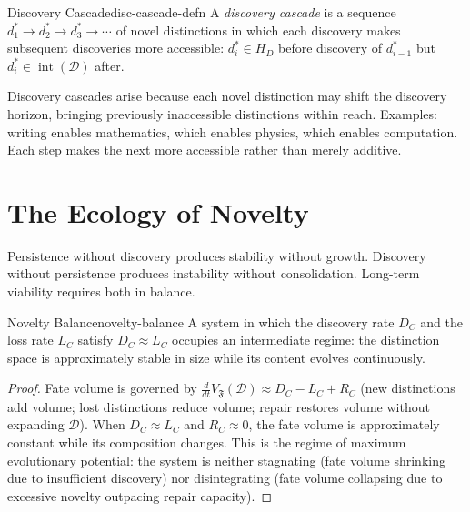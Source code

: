 \documentclass[12pt,twoside,openright]{book}
\newcommand{\distset}{\mathcal{D}}        %
\newcommand{\fateMap}{\mathfrak{F}}
\providecommand{\fateVol}[1]{V_{\fateMap}(#1)}
\providecommand{\discRate}{D_{C}}
\providecommand{\lossRate}{L_{C}}
\providecommand{\repairRate}{R_{C}}
\providecommand{\discHorizon}{H_{D}}
\begin{document}
\begin{definition}{Discovery Cascade}{disc-cascade-defn}
A \emph{discovery cascade} is a sequence
$d_1^*\to d_2^*\to d_3^*\to\cdots$ of novel distinctions in
which each discovery makes subsequent discoveries more
accessible: $d_i^*\in\discHorizon$ before discovery of
$d_{i-1}^*$ but $d_i^*\in\operatorname{int}(\distset)$ after.
\end{definition}

Discovery cascades arise because each novel distinction may
shift the discovery horizon, bringing previously inaccessible
distinctions within reach. Examples: writing enables
mathematics, which enables physics, which enables computation.
Each step makes the next more accessible rather than merely
additive.

\section{The Ecology of Novelty}

Persistence without discovery produces stability without growth.
Discovery without persistence produces instability without
consolidation. Long-term viability requires both in balance.

\begin{proposition}{Novelty Balance}{novelty-balance}
A system in which the discovery rate $\discRate$ and the loss
rate $\lossRate$ satisfy $\discRate\approx\lossRate$ occupies
an intermediate regime: the distinction space is approximately
stable in size while its content evolves continuously.
\begin{proof}
Fate volume is governed by
$\frac{d}{dt}\fateVol{\distset}
\approx\discRate-\lossRate+\repairRate$
(new distinctions add volume; lost distinctions reduce volume;
repair restores volume without expanding $\distset$). When
$\discRate\approx\lossRate$ and $\repairRate\approx 0$, the
fate volume is approximately constant while its composition
changes. This is the regime of maximum evolutionary potential:
the system is neither stagnating (fate volume shrinking due to
insufficient discovery) nor disintegrating (fate volume
collapsing due to excessive novelty outpacing repair capacity).
\end{proof}
\end{proposition}
\end{document}
